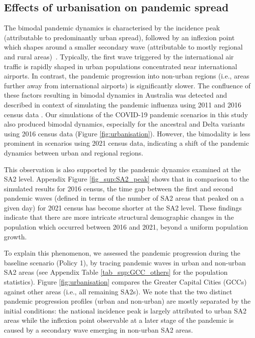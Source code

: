 \documentclass{article}
\begin{document}
\subsection{Effects of urbanisation on pandemic spread}
\label{sec:urbanisation}
The bimodal pandemic dynamics is characterised by the incidence peak (attributable to  predominantly urban spread), followed by an inflexion point which shapes around a smaller secondary wave (attributable to mostly regional and rural areas)~\cite{zachreson_urbanization_2018}.
Typically, the first wave triggered by the international air traffic is rapidly shaped in  urban populations concentrated near international airports. 
In contrast, the pandemic progression into non-urban regions (i.e., areas further away from international airports) is significantly slower. The confluence of these factors resulting in  bimodal dynamics in Australia was detected and described in context of simulating the pandemic influenza using 2011 and 2016 census data \cite{zachreson_urbanization_2018}. Our simulations of the COVID-19 pandemic scenarios in this study also produced  bimodal dynamics, especially for the ancestral and Delta variants using 2016 census data (Figure \ref{fig:urbanisation}). However, the bimodality is less prominent in scenarios using 2021 census data, indicating a shift of the pandemic dynamics  between urban and regional regions. 

This observation is also supported by the pandemic dynamics examined at the SA2 level. Appendix Figure \ref{fig_sup:SA2_peak} shows that in comparison to the simulated results for 2016 census, the time gap between the first and second pandemic waves (defined in terms of the number of SA2 areas that peaked on a given day) for 2021 census has become shorter at the SA2 level. These findings indicate that there are more intricate structural demographic changes in the population which occurred between 2016 and 2021, beyond a uniform population growth.

To explain this phenomenon, we assessed the pandemic progression during the baseline scenario (Policy 1), by tracing pandemic waves in urban and non-urban SA2 areas (see Appendix Table \ref{tab_sup:GCC_others} for the population statistics). Figure \ref{fig:urbanisation} compares the Greater Capital Cities (GCCs) against other areas (i.e., all remaining SA2s). We note that the two distinct pandemic progression profiles (urban and non-urban) are mostly separated by the initial conditions: the national incidence peak is largely attributed to urban SA2 areas while the inflexion point observable at a later stage of the pandemic is caused by a secondary wave emerging in non-urban SA2 areas. 
\end{document}
